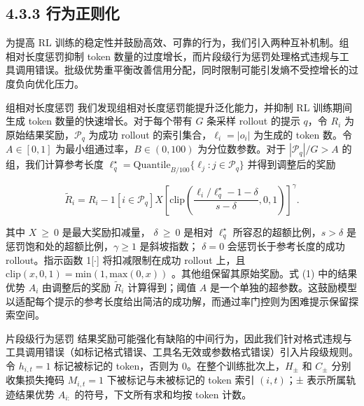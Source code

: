 \subsection{4.3.3 行为正则化}\label{behavioral-regularization}

为提高 RL 训练的稳定性并鼓励高效、可靠的行为，我们引入两种互补机制。组相对长度惩罚抑制 token 数量的过度增长，而片段级行为惩罚处理格式违规与工具调用错误。批级优势重平衡改善信用分配，同时限制可能引发熵不受控增长的过度负向优化压力。

组相对长度惩罚 我们发现组相对长度惩罚能提升泛化能力，并抑制 RL 训练期间生成 token 数量的快速增长。对于每个带有 $G$ 条采样 rollout 的提示 $q$，令 \(R _ { i }\) 为原始结果奖励，\(\mathcal { P } _ { q }\) 为成功 rollout 的索引集合，\(\ell _ { i } = | o _ { i } |\) 为生成的 token 数。令 \(A \in [ 0 , 1 ]\) 为最小组通过率，\(B \in ( 0 , 1 0 0 )\) 为分位数参数。对于 \(| { \mathcal { P } } _ { q } | / G > A\) 的组，我们计算参考长度
\(\ell _ { q } ^ { \star } = \mathrm { Q u a n t i l e } _ { B / 1 0 0 } \{ \ell _ { j } : j \in \mathcal { P } _ { q } \}\)
并得到调整后的奖励

\[
\widetilde { R } _ { i } = R _ { i } - 1 \left[ i \in \mathcal { P } _ { q } \right] X \left[ \mathrm { c l i p } \left( \frac { \ell _ { i } / \ell _ { q } ^ { \star } - 1 - \delta } { s - \delta } , 0 , 1 \right) \right] ^ { \gamma } .\tag{4}
\]

其中 \(X ~ \geq ~ 0\) 是最大奖励扣减量，
\(\delta \ \geq \ 0\) 是相对 \(\ell _ { q } ^ { \star }\) 所容忍的超额比例，\(s > \delta\) 是惩罚饱和处的超额比例，\(\gamma \geq 1\) 是斜坡指数；
\(\delta = 0\) 会惩罚长于参考长度的成功 rollout。指示函数 1{[}$\cdot${]} 将扣减限制在成功 rollout 上，且
\(\mathrm { c l i p } ( x , 0 , 1 ) = \mathrm { m i n } ( 1 , \mathrm { m a x } ( 0 , x ) )\)
。其他组保留其原始奖励。式 (1) 中的结果优势 \(A _ { i }\) 由调整后的奖励 \(\widetilde { R } _ { i }\) 计算得到；阈值 $A$ 是一个单独的超参数。这鼓励模型以适配每个提示的参考长度给出简洁的成功解，而通过率门控则为困难提示保留探索空间。



片段级行为惩罚 结果奖励可能强化有缺陷的中间行为，因此我们针对格式违规与工具调用错误（如标记格式错误、工具名无效或参数格式错误）引入片段级规则。令 \(h _ { i , t } = 1\) 标记被标记的 token，否则为 0。在整个训练批次上，\(H _ { \pm }\) 和 \(C _ { \pm }\) 分别收集损失掩码 \(M _ { i , t } = 1\) 下被标记与未被标记的 token 索引 \(( i , t )\)；± 表示所属轨迹结果优势 \(A _ { i : }\) 的符号，下文所有求和均按 token 计数。


